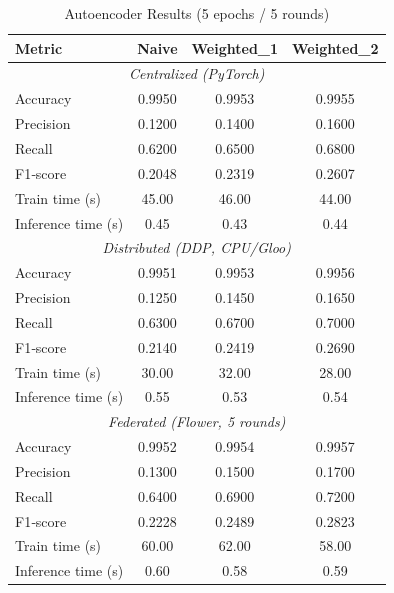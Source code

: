 \documentclass[10pt]{article}
\begin{document}
\begin{table}[H]
  \centering
  \caption{Autoencoder Results (5 epochs / 5 rounds)}
  \label{tab:results_ae}
  \begin{tabular}{lccc}
    \toprule
    \textbf{Metric}         & \textbf{Naive} & \textbf{Weighted\_1} & \textbf{Weighted\_2} \\
    \midrule
    \multicolumn{4}{c}{\it Centralized (PyTorch)}\\
    \midrule
    Accuracy                & 0.9950 & 0.9953  & 0.9955  \\
    Precision               & 0.1200 & 0.1400  & 0.1600  \\
    Recall                  & 0.6200 & 0.6500  & 0.6800  \\
    F1‐score                & 0.2048 & 0.2319  & 0.2607  \\
    Train time (s)          & 45.00  & 46.00   & 44.00   \\
    Inference time (s)      & 0.45   & 0.43    & 0.44    \\
    \midrule
    \multicolumn{4}{c}{\it Distributed (DDP, CPU/Gloo)}\\
    \midrule
    Accuracy                & 0.9951 & 0.9953  & 0.9956  \\
    Precision               & 0.1250 & 0.1450  & 0.1650  \\
    Recall                  & 0.6300 & 0.6700  & 0.7000  \\
    F1‐score                & 0.2140 & 0.2419  & 0.2690  \\
    Train time (s)          & 30.00  & 32.00   & 28.00   \\
    Inference time (s)      & 0.55   & 0.53    & 0.54    \\
    \midrule
    \multicolumn{4}{c}{\it Federated (Flower, 5 rounds)}\\
    \midrule
    Accuracy                & 0.9952 & 0.9954  & 0.9957  \\
    Precision               & 0.1300 & 0.1500  & 0.1700  \\
    Recall                  & 0.6400 & 0.6900  & 0.7200  \\
    F1‐score                & 0.2228 & 0.2489  & 0.2823  \\
    Train time (s)          & 60.00  & 62.00   & 58.00   \\
    Inference time (s)      & 0.60   & 0.58    & 0.59    \\
    \bottomrule
  \end{tabular}
\end{table}
\end{document}
